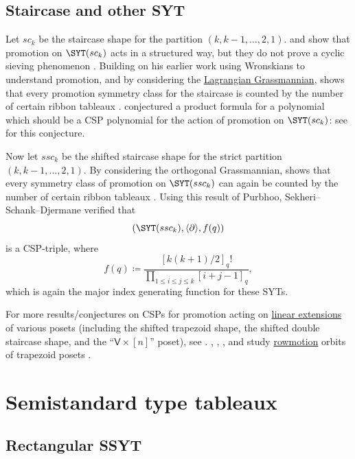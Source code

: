 \subsection[cspStaircaseSYT]{Staircase and other SYT}



Let $sc_k$ be the staircase shape for the partition $(k,k-1,\dotsc,2,1)$.
 and  show that promotion on
$\SYT(sc_k)$ acts in a structured way, but they do not prove a cyclic sieving
phenomenon \cite{PonWang2011}.  Building on his earlier work using Wronskians
to understand promotion, and by considering the
\hyperref[grassmannianVarieties]{Lagrangian Grassmannian},
 shows that every promotion symmetry class for the
staircase is counted by the number of certain ribbon tableaux
\cite{Purbhoo2018}.
 conjectured a product formula for a polynomial
which should be a CSP polynomial for the action of
promotion on $\SYT(sc_k)$: see \cite{Hopkins2020} for this conjecture.

Now let $ssc_k$ be the shifted staircase shape for the strict
partition $(k,k-1,\dotsc,2,1)$.  By considering the orthogonal Grassmannian,
 shows that every symmetry class of promotion on
$\SYT(ssc_k)$ can again be counted by the number of certain ribbon tableaux
\cite{Purbhoo2018}.
Using this result of Purbhoo, Sekheri--Schank--Djermane \cite{SekheriSchankDjermane2014}
verified that
\[
(\SYT(ssc_k),\langle\partial\rangle,f(q))
\]
is a CSP-triple, where
\[
f(q)\coloneqq \frac{[k(k+1)/2]_q!}{\prod_{1\leq i \leq j \leq k}[i+j-1]_q},
\]
which is again the major index generating function for these SYTs.

For more results/conjectures on CSPs for promotion acting on
\hyperref[linearExtension]{linear extensions} of various posets (including the
shifted trapezoid shape, the shifted double staircase shape, and the
\enquote{$\mathsf{V}\times[n]$} poset), see \cite{Hopkins2020}.
, , , and
 study \hyperref[rowmotion]{rowmotion} orbits of
trapezoid posets
\cite{DaoWellmanYostWolffZhang2020}.



\section[cspListSSTableaux]{Semistandard type tableaux}

\subsection[cspRectangularSSYT]{Rectangular SSYT}

